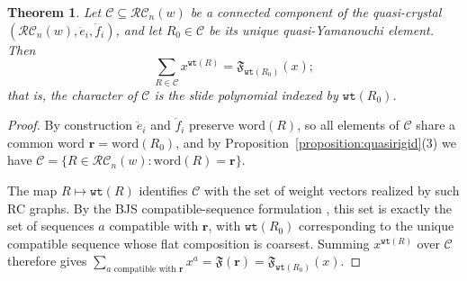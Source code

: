 \documentclass{amsart}
\newtheorem{theorem}{Theorem}[section]
\theoremstyle{definition}
\theoremstyle{remark}
\numberwithin{equation}{subsection}
\newcommand{\wtt}{\mathtt{wt}}
\newcommand{\RC}{\mathcal{RC}}
\begin{document}
\begin{theorem}\label{theorem:quasicharacter}
Let $\mathcal{C}\subseteq\RC_n(w)$ be a connected component of the quasi-crystal $(\RC_n(w),\ddot{e}_i,\ddot{f}_i)$, and let $R_0\in\mathcal{C}$ be its unique quasi-Yamanouchi element. Then
$$\sum_{R\in\mathcal{C}}x^{\wtt(R)} = \mathfrak{F}_{\wtt(R_0)}(x);$$
that is, the character of $\mathcal{C}$ is the slide polynomial indexed by $\wtt(R_0)$.
\end{theorem}
\begin{proof}
By construction $\ddot{e}_i$ and $\ddot{f}_i$ preserve $\mathrm{word}(R)$, so all elements of $\mathcal{C}$ share a common word $\mathbf{r}=\mathrm{word}(R_0)$, and by Proposition~\ref{proposition:quasirigid}(3) we have $\mathcal{C}=\{R\in\RC_n(w):\mathrm{word}(R)=\mathbf{r}\}$.

The map $R\mapsto\wtt(R)$ identifies $\mathcal{C}$ with the set of weight vectors realized by such RC graphs. By the BJS compatible-sequence formulation \cite{bjs}, this set is exactly the set of sequences $a$ compatible with $\mathbf{r}$, with $\wtt(R_0)$ corresponding to the unique compatible sequence whose flat composition is coarsest. Summing $x^{\wtt(R)}$ over $\mathcal{C}$ therefore gives $\sum_{a\text{ compatible with }\mathbf{r}}x^{a} = \mathfrak{F}(\mathbf{r}) = \mathfrak{F}_{\wtt(R_0)}(x)$.
\end{proof}
\end{document}
